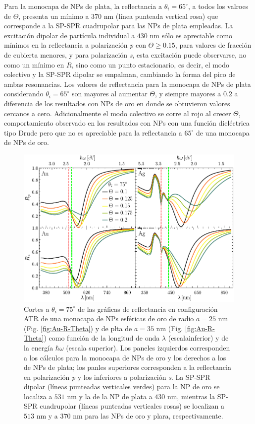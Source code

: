 Para la monocapa de NPs de plata, la reflectancia a $\theta_i=65^\circ$, a todos los valroes de $\Theta$, presenta un mínimo a $370$ nm (línea punteada vertical rosa) que corresponde a la SP-SPR cuadrupolar para las NPs de plata empleadas. La excitación dipolar de partícula individual a $430$ nm sólo es apreciable como mínimos en la reflectancia a polarización \emph{p} con $\Theta \geq 0.15$, para valores de fracción de cubierta menores, y para polarización \emph{s}, esta excitación puede observarse, no como un mínimo en $R$, sino como un punto estacionario, es decir, el modo colectivo y la SP-SPR dipolar se empalman, cambiando la forma del pico de ambas resonancias. Los valores de reflectancia para la monocapa de NPs de plata considerando $\theta_i=65^\circ$ son mayores al aumentar $\Theta$, y siempre mayores a $0.2$ a diferencia de los resultados con NPs de oro en donde se obtuvieron valores cercanos a cero. Adicionalmente el modo colectivo se corre al rojo al crecer $\Theta$, comportamiento observado en los resultados con NPs con una función dieléctrica tipo Drude pero que no es apreciable para la reflectancia  a  $65^\circ$ de una monocapa de NPs de oro.	
	
	\begin{figure}[h!]\centering
	\includegraphics[scale=1]{2-Resultados/figs/6-AuThetaVar/0-cut75_Au_Aug.pdf}\vspace*{-.5em}
	\caption{Cortes a $\theta_i = 75^\circ$ de las gráficas de reflectancia  en configuración ATR  de una monocapa de NPs esféricas de oro de radio $a=25$ nm (Fig. \ref{fig:Au-R-Theta}) y de plta de $a=35$ nm (Fig. \ref{fig:Au-R-Theta}) como función de la longitud de onda $\lambda$ (escalainferior) y de la energía $\hbar\omega$ (escala superior). Los paneles izquierdos corresponden a los cálculos para la monocapa de NPs de oro y los derechos a los de NPs de plata; los panles superiores corresponden a la reflectancia en polarización \emph{p} y los inferiores a polarización \emph{s}. La SP-SPR dipolar (líneas punteadas verticales verdes) para la NP de oro se localiza a $531$ nm y la de la NP de plata a $430$ nm, mientras la SP-SPR cuadrupolar (líneas punteadas verticales rosas) se localizan a $513$ nm y a $370$ nm para las NPs de oro y plara, respectivamente.}\label{fig:AuAg-Cuts-75}
	\end{figure}	

